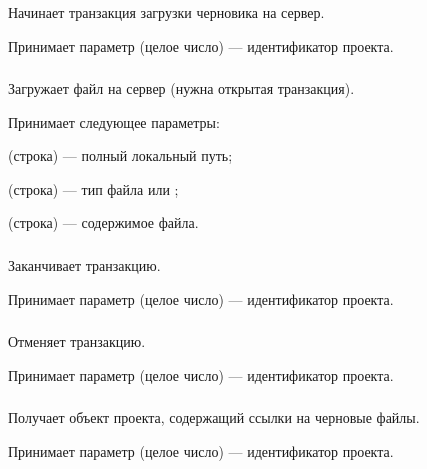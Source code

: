 \subsubsection{}

Начинает транзакция загрузки черновика на сервер.

Принимает параметр  (целое число) — идентификатор проекта.

\subsubsection{}

Загружает файл на сервер (нужна открытая транзакция). 

Принимает следующее параметры:

\begin{icItems}
	\item {} (строка) — полный локальный путь;
	\item {} (строка) — тип файла  или ;
	\item {} (строка) — содержимое файла.
\end{icItems}

\subsubsection{}

Заканчивает транзакцию.

Принимает параметр  (целое число) — идентификатор проекта.

\subsubsection{}

Отменяет транзакцию.

Принимает параметр  (целое число) — идентификатор проекта.

\subsubsection{}

Получает объект проекта, содержащий ссылки на черновые файлы. 

Принимает параметр  (целое число) — идентификатор проекта.

